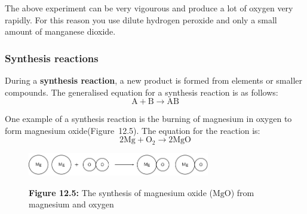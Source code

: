 	\par
      \label{m38709*eip-633}The above experiment can be very vigourous and produce a lot of oxygen very rapidly. For this reason you use dilute hydrogen peroxide and only a small amount of manganese dioxide. \par 
      \label{m38709*uid17}
            \subsubsection{ Synthesis reactions}
            \nopagebreak
            \label{m38709*id63365}During a \textbf{synthesis reaction}, a new product is formed from elements or smaller compounds. The generalised equation for a synthesis reaction is as follows:
        \label{m38709*id63374}\nopagebreak\noindent{}
    \begin{equation}
    \mathrm{A}+\mathrm{B}\to \mathrm{AB}\tag{12.4}
      \end{equation}
    \par 
        \label{m38709*id63386}One example of a synthesis reaction is the burning of magnesium in oxygen to form magnesium oxide(Figure~12.5). The equation for the reaction is:
        \label{m38709*id63390}\nopagebreak\noindent{}
    \begin{equation}
    2\mathrm{Mg}+{\mathrm{O}}_{2}\to 2\mathrm{MgO}\tag{12.5}
      \end{equation}
    \setcounter{subfigure}{0}
	\begin{figure}[H] %
    \begin{center}
    \label{m38709*uid18!!!underscore!!!media}\label{m38709*uid18!!!underscore!!!printimage}\includegraphics[width=300px]{col11305.imgs/m38709_CG10C4_005.png} %
      \vspace{2pt}
    \vspace{\rubberspace}\par \begin{cnxcaption}
	  \small \textbf{Figure 12.5: }The synthesis of magnesium oxide ($\mathrm{MgO}$) from magnesium and oxygen
	\end{cnxcaption}
    \vspace{.1in}
    \end{center}
 \end{figure}       \par 
\label{m38709*secfhsst!!!underscore!!!id243}
